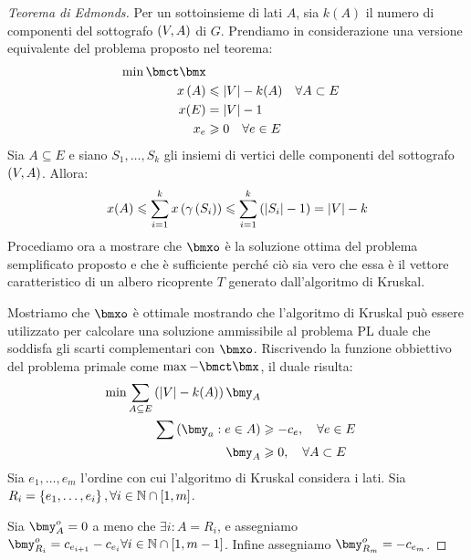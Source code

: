\documentclass[\main/main.tex]{subfiles}
\begin{document}
\begin{proof}[Teorema di Edmonds]
  Per un sottoinsieme di lati \(A\), sia \(k(A)\) il numero di componenti del sottografo \(\left(V, A\right)\) di \(G\). Prendiamo in considerazione una versione equivalente del problema proposto nel teorema:
  \begin{align*}
    \min \bmct\bmx                                           \\
    x\rnd{A} & \leq \abs{V} - k(A) \quad \forall A \subset E \\
    x(E)     & = \abs{V} -1                                  \\
    x_e      & \geq 0 \quad \forall e \in E
  \end{align*}
  Sia \(A \subseteq E\) e siano \(S_1, \ldots, S_k\) gli insiemi di vertici delle componenti del sottografo \(\left(V, A\right)\). Allora:
  \[
    x(A) \leqslant \sum_{i=1}^k x\left(\gamma\left(S_i\right)\right) \leqslant \sum_{i=1}^k \left(\left\lvert S_i\right\rvert-1\right) = \left\lvert V\right\rvert - k
  \]
  Procediamo ora a mostrare che \(\bmxo\) è la soluzione ottima del problema semplificato proposto e che è sufficiente perché ciò sia vero che essa è il vettore caratteristico di un albero ricoprente \(T\) generato dall'algoritmo di Kruskal.

  Mostriamo che \(\bmxo\) è ottimale mostrando che l'algoritmo di Kruskal può essere utilizzato per calcolare una soluzione ammissibile al problema PL duale che soddisfa gli scarti complementari con \(\bmxo\). Riscrivendo la funzione obbiettivo del problema primale come \(\max -\bmct\bmx \), il duale risulta:
  \begin{align*}
    \min \sum_{A \subseteq E} \rnd{\abs{V} - k(A)}\bmy_A           \\
    \sum \rnd{\bmy_a: e \in A} & \geq -c_e, \quad \forall e \in E  \\
    \bmy_A                     & \geq 0, \quad \forall A \subset E
  \end{align*}
  Sia \(e_1, \ldots, e_m\) l'ordine con cui l'algoritmo di Kruskal considera i lati. Sia \(R_i = \left\{e_1, \ldots, e_i\right\}, \forall i \in \mathbb{N} \cap \left[1, m\right]\).

  Sia \(\bmy_A^o=0\) a meno che \(\exists i: A = R_i\), e assegniamo \(\bmy^o_{R_i} = c_{e_{i+1}} - c_{e_{i}} \forall i \in \N \cap \sqr{1, m-1}\). Infine assegniamo \(\bmy^o_{R_m} = -c_{e_m}\).


\end{proof}
\end{document}
